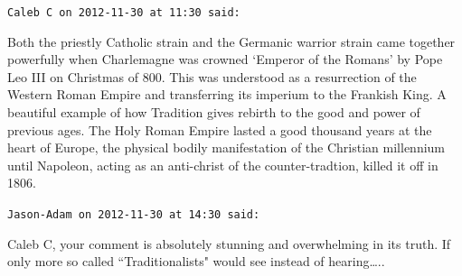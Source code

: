 \begin{footnotesize}
\begin{sffamily}
\hfill

\texttt{Caleb C on 2012-11-30 at 11:30 said: }

Both the priestly Catholic strain and the Germanic warrior strain came together powerfully when Charlemagne was crowned `Emperor of the Romans' by Pope Leo III on Christmas of 800. This was understood as a resurrection of the Western Roman Empire and transferring its imperium to the Frankish King. A beautiful example of how Tradition gives rebirth to the good and power of previous ages. The Holy Roman Empire lasted a good thousand years at the heart of Europe, the physical bodily manifestation of the Christian millennium until Napoleon, acting as an anti-christ of the counter-tradtion, killed it off in 1806.


\hfill

\texttt{Jason-Adam on 2012-11-30 at 14:30 said: }

Caleb C, your comment is absolutely stunning and overwhelming in its truth. If only more so called ``Traditionalists" would see instead of hearing…..


\end{sffamily}\end{footnotesize}
